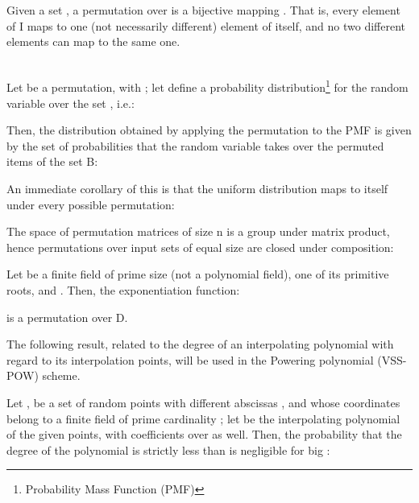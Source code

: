 \documentclass[10pt,journal,cspaper,compsoc]{IEEEtran}
\begin{document}
\begin{defn}[Permutation]
Given a set , a permutation over  is a bijective mapping . That is, every element of I maps to one (not necessarily different) element of  itself, and no two different elements can map to the same one.
\end{defn}

\begin{lem}~\\
\label{Lemma:permprob}
Let  be a permutation, with ; let  define a probability distribution\footnote{Probability Mass Function (PMF)} for the random variable  over the set , i.e.:

Then, the distribution obtained by applying the permutation  to the PMF  is given by the set of probabilities that the random variable  takes over the permuted items of the set B:

\end{lem}

An immediate corollary of this is that the uniform distribution maps to itself under every possible permutation:


\begin{lem}
\label{Lemma:permcomp}
The space of permutation matrices of size n  is a group under matrix product, hence permutations over input sets of equal size are closed under composition:


\end{lem}

\begin{lem}
\label{Lemma:onewayperm}
Let  be a finite field of prime size (not a polynomial field),  one of its primitive roots, and . Then, the exponentiation function:

is a permutation over D. \end{lem}

The following result, related to the degree of an interpolating polynomial with regard to its interpolation points, will be used in the Powering polynomial (VSS-POW) scheme.

\begin{thm}
\label{thm:probdegreeinterp}
Let ,  be a set of  random points with different abscissas , and whose coordinates belong to a finite field  of prime cardinality ;
let  be the interpolating polynomial of the given points, with coefficients over  as well.
Then, the probability that the degree of the polynomial   is strictly less than  is negligible for big :

\end{thm}
\end{document}
